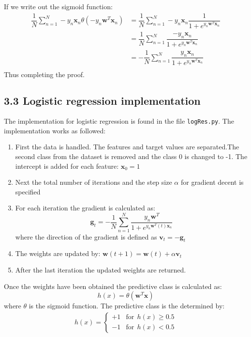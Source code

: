 \documentclass{article}
\begin{document}
If we write out the sigmoid function:
\begin{align*}
\dfrac{1}{N} \sum\limits_{n=1}^N -y_n\mathbf{x}_n\theta(-y_n\mathbf{w}^T \mathbf{x}_n) &= \dfrac{1}{N} \sum\limits_{n=1}^N -y_n\mathbf{x}_n \dfrac{1}{ 1+ e^{ y_n \mathbf{w}^T \mathbf{x}_n}} \\
&=
\dfrac{1}{N} \sum\limits_{n=1}^N \dfrac{-y_n\mathbf{x}_n}{ 1+ e^{ y_n \mathbf{w}^T \mathbf{x}_n}}\\
&=
-\dfrac{1}{N} \sum\limits_{n=1}^N \dfrac{y_n\mathbf{x}_n}{ 1+ e^{ y_n \mathbf{w}^T \mathbf{x}_n}} \\
\end{align*}
Thus completing the proof.
\subsection{3.3 Logistic regression implementation}
The implementation for logistic regression is found in the file \texttt{logRes.py}. The implementation works as followed:
\begin{enumerate}
\item{First the data is handled. The features and target values are separated.The second class from the dataset is removed and the class 0 is changed to -1. The intercept is added for each feature: $\mathbf{x}_0 = 1$}
\item{Next the total number of iterations and the step size $\alpha$ for gradient decent is specified}
\item{ For each iteration the gradient is calculated as:
\begin{equation*}
\mathbf{g}_t = - \dfrac{1}{N} \sum\limits_{n=1}^N
\dfrac{y_n \mathbf{w}^T }
{1+ e^{ y_n \mathbf{w}^T(t)\mathbf{x}_n}}
\end{equation*}
where the direction of the gradient is defined as
$\mathbf{v}_t = -\mathbf{g}_t $
}
\item{ The weights are updated by:
$\mathbf{w}(t+1) = \mathbf{w}(t) + \alpha \mathbf{v}_t$}
\item{After the last iteration the updated weights are returned.}
\end{enumerate}
Once the weights have been obtained the predictive class is calculated as:
\begin{equation*}
h(x) = \theta(\mathbf{w}^T\mathbf{x})
\end{equation*}
where $\theta$ is the sigmoid function. The predictive class is the determined by:
\begin{align*}
h(x) =
\begin{cases} 
      +1 & \text{for} \;\, h(x) \geq 0.5 \\
      -1 & \text{for} \;\, h(x) < 0.5
   \end{cases}
\end{align*}
\end{document}
